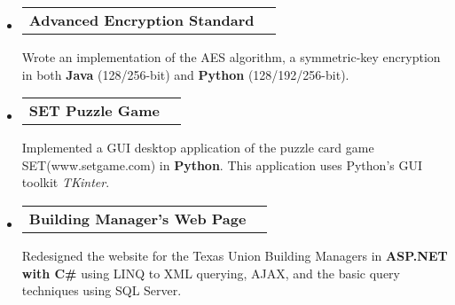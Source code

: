 \documentclass[letterpaper,10pt]{article}
\makeatletter
\newcommand{\projectheading}[1]{
\begin{tabular*}{6.5in}{l@{\extracolsep{\fill}}r}
		\textbf{#1}
\end{tabular*}\vspace{6pt}}
\makeatother
\begin{document}
\begin{itemize}
		\item 
			\projectheading{Advanced Encryption Standard}
				{
				\begin{itemize}\vspace{-6pt}
					{Wrote an implementation of the AES algorithm, a symmetric-key encryption}
					{in both \textbf{Java} (128/256-bit) and \textbf{Python} (128/192/256-bit).}
				\end{itemize}
				}
		\item
			\projectheading{SET Puzzle Game}
				{
				\begin{itemize}\vspace{-6pt}
					{Implemented a GUI desktop application of the puzzle card game SET(www.setgame.com) in \textbf{Python}.}
					{This application uses Python's GUI toolkit}
					{\textit{TKinter}.}
				\end{itemize}
				}
		\item
			\projectheading{Building Manager's Web Page}
				{
				\begin{itemize}\vspace{-6pt}
					{Redesigned the website for the Texas Union Building Managers in \textbf{ASP.NET with C\#} using}
					{LINQ to XML querying, AJAX, and the basic query techniques using SQL Server.}
				\end{itemize}
				}\vspace{-6pt}
\begin{comment}
		\item			
			\projectheading{L1 Cache Simulator}
				{
				\begin{itemize}
					{Programmed a Level 1 cache simulator in Java. This project was designed to give an understanding on how}
					{caching hardware work with respect to memory. The cache simulator's funtionally represents the functions}
					{of actual cache hardware, such as write backs, write allocations, and the LRU replacement algorithm.}
				\end{itemize}
				}
        		\item
			\projectheading{Proportional-Share Network Scheduler}
				{
				\begin{itemize}\vspace{-6pt}
					{Implemented a simple network scheduler program in C++. The goal of the project was to acquire}
					{experience in writing and debugging multithreaded code.}
				\end{itemize}
				}
\end{comment}
	\end{itemize}  %
\end{document}
